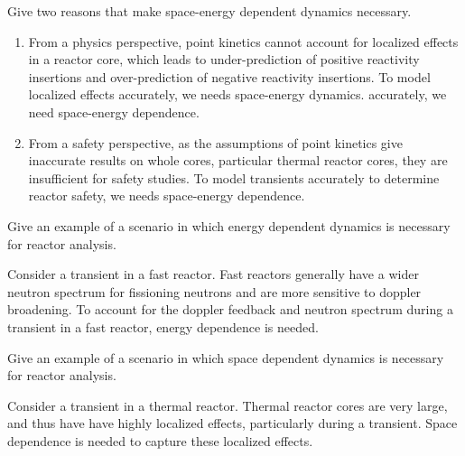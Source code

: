 \documentclass[11pt,addpoints,answers]{exam}
\begin{document}
\begin{questions}

        \question[20] Give two reasons that make space-energy dependent 
        dynamics necessary. 
                \begin{solution}
                    \begin{enumerate}
                        \item From a physics perspective, point kinetics cannot
                            account for localized effects in a reactor core,
                            which leads to under-prediction of positive
                            reactivity insertions and over-prediction of
                            negative reactivity insertions. To model localized
                            effects accurately, we needs space-energy dynamics.
                            accurately, we need space-energy dependence.
                        \item From a safety perspective, as the assumptions of
                            point kinetics give inaccurate results on whole
                            cores, particular thermal reactor cores, they are
                            insufficient for safety studies. To model transients
                            accurately to determine reactor safety, we needs
                            space-energy dependence.
                    \end{enumerate}
                \end{solution}


        \question[10] Give an example of a scenario in which energy dependent 
        dynamics is necessary for reactor analysis.
                \begin{solution}
                    Consider a transient in a fast reactor. Fast reactors
                    generally have a wider neutron spectrum for fissioning
                    neutrons and are more sensitive to doppler broadening. To
                    account for the doppler feedback and neutron spectrum during
                    a transient in a fast reactor, energy dependence is needed.
                \end{solution}



        \question[10] Give an example of a scenario in which space dependent 
        dynamics is necessary for reactor analysis.
                \begin{solution}
                    Consider a transient in a thermal reactor. Thermal reactor
                    cores are very large, and thus have have highly localized
                    effects, particularly during a transient. Space dependence
                    is needed to capture these localized effects.
                \end{solution}





\end{questions}
\end{document}

